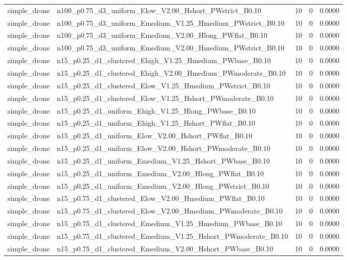 \begin{tabular}{llrrr}
simple_drone & n100_p0.75_d3_uniform_Elow_V2.00_Hshort_PWstrict_B0.10 & 10 & 0 & 0.0000 \\
simple_drone & n100_p0.75_d3_uniform_Emedium_V1.25_Hmedium_PWstrict_B0.10 & 10 & 0 & 0.0000 \\
simple_drone & n100_p0.75_d3_uniform_Emedium_V2.00_Hlong_PWflat_B0.10 & 10 & 0 & 0.0000 \\
simple_drone & n100_p0.75_d3_uniform_Emedium_V2.00_Hmedium_PWstrict_B0.10 & 10 & 0 & 0.0000 \\
simple_drone & n15_p0.25_d1_clustered_Ehigh_V1.25_Hmedium_PWbase_B0.10 & 10 & 0 & 0.0000 \\
simple_drone & n15_p0.25_d1_clustered_Ehigh_V2.00_Hmedium_PWmoderate_B0.10 & 10 & 0 & 0.0000 \\
simple_drone & n15_p0.25_d1_clustered_Elow_V1.25_Hmedium_PWstrict_B0.10 & 10 & 0 & 0.0000 \\
simple_drone & n15_p0.25_d1_clustered_Elow_V1.25_Hshort_PWmoderate_B0.10 & 10 & 0 & 0.0000 \\
simple_drone & n15_p0.25_d1_uniform_Ehigh_V1.25_Hlong_PWbase_B0.10 & 10 & 0 & 0.0000 \\
simple_drone & n15_p0.25_d1_uniform_Ehigh_V1.25_Hshort_PWflat_B0.10 & 10 & 0 & 0.0000 \\
simple_drone & n15_p0.25_d1_uniform_Elow_V2.00_Hshort_PWflat_B0.10 & 10 & 0 & 0.0000 \\
simple_drone & n15_p0.25_d1_uniform_Elow_V2.00_Hshort_PWmoderate_B0.10 & 10 & 0 & 0.0000 \\
simple_drone & n15_p0.25_d1_uniform_Emedium_V1.25_Hshort_PWbase_B0.10 & 10 & 0 & 0.0000 \\
simple_drone & n15_p0.25_d1_uniform_Emedium_V2.00_Hlong_PWflat_B0.10 & 10 & 0 & 0.0000 \\
simple_drone & n15_p0.25_d1_uniform_Emedium_V2.00_Hlong_PWstrict_B0.10 & 10 & 0 & 0.0000 \\
simple_drone & n15_p0.75_d1_clustered_Elow_V2.00_Hmedium_PWflat_B0.10 & 10 & 0 & 0.0000 \\
simple_drone & n15_p0.75_d1_clustered_Elow_V2.00_Hmedium_PWmoderate_B0.10 & 10 & 0 & 0.0000 \\
simple_drone & n15_p0.75_d1_clustered_Emedium_V1.25_Hmedium_PWbase_B0.10 & 10 & 0 & 0.0000 \\
simple_drone & n15_p0.75_d1_clustered_Emedium_V1.25_Hshort_PWmoderate_B0.10 & 10 & 0 & 0.0000 \\
simple_drone & n15_p0.75_d1_clustered_Emedium_V2.00_Hshort_PWbase_B0.10 & 10 & 0 & 0.0000 \\

\end{tabular}
